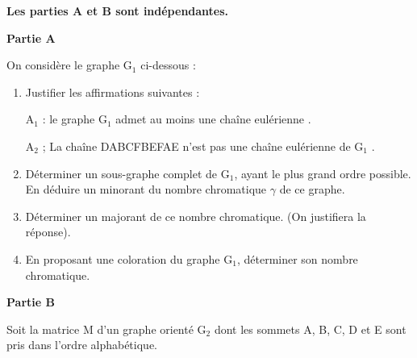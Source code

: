 \documentclass[]{prof}
\begin{document}
\vfill\newpage\null 


\textbf{Les parties A et B sont indépendantes.}

\textbf{Partie A}

On considère le graphe G$_{1}$ ci-dessous :

\bigskip

\begin{center}
\end{center}

\medskip

\begin{enumerate}
\item Justifier les affirmations suivantes :

A$_{1}$ : \og le graphe G$_1$ admet au moins une chaîne eulérienne \fg.

A$_{2}$ ; \og La chaîne DABCFBEFAE n'est pas une chaîne eulérienne de G$_1$ \fg.

\item Déterminer un sous-graphe complet de G$_1$, ayant le plus grand ordre possible. En déduire un minorant du nombre chromatique $\gamma$ de ce graphe.

\item Déterminer un majorant de ce nombre chromatique. (On justifiera la réponse).

\item En proposant une coloration du graphe G$_1$, déterminer son nombre chromatique.

\end{enumerate}

\medskip

\textbf{Partie B}

Soit la matrice M d'un graphe orienté G$_2$ dont les sommets A, B, C, D et E sont pris dans l'ordre alphabétique.
\end{document}
